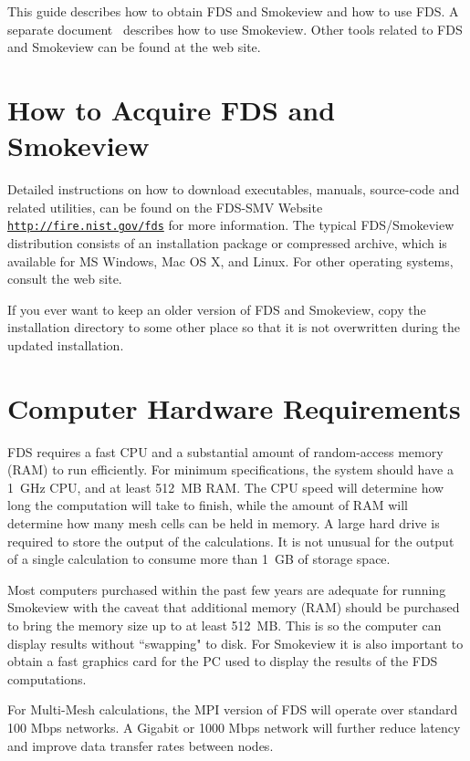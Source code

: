 \documentclass[11pt]{book}
\newcommand{\ct}{\tt\small}
\begin{document}
This guide describes how to obtain FDS and Smokeview and how to use FDS.
A separate document~\cite{Smokeview_Users_Guide_5} describes how to use Smokeview. Other tools related to
FDS and Smokeview can be found at the web site.

\section{How to Acquire FDS and Smokeview}
\label{info:sfcvs}
Detailed instructions on how to download executables, manuals, source-code and related utilities,
can be found on the FDS-SMV Website
\href{http://fire.nist.gov/fds}{{\ct http://fire.nist.gov/fds}} for more information.
The typical FDS/Smokeview distribution consists of an installation package or compressed archive, which is available for MS Windows, Mac OS X, and Linux.  For other operating systems, consult the web site.

\begin{warning}
\noindent
If you ever want to keep an older version of FDS and Smokeview, copy the installation directory to some other
place so that it is not overwritten during the updated installation.
\end{warning}

\section{Computer Hardware Requirements}
FDS requires a fast CPU and a substantial amount of random-access memory (RAM) to run efficiently.
For minimum specifications, the system should have a 1~GHz CPU, and at least 512~MB RAM.
The CPU speed will determine how long the computation will take to finish, while the amount
of RAM will determine how many mesh cells can be held in memory.
A large hard drive is required to store the output of the calculations. It is not unusual for
the output of a single calculation to consume more than 1~GB of storage space.

Most computers purchased within the past few years are adequate for running Smokeview
with the caveat that additional memory (RAM) should be purchased to bring the
memory size up to at least 512~MB. This is so the computer can display results without
``swapping" to disk. For Smokeview it is also important to obtain a fast graphics card
for the PC used to display the results of the FDS computations.

For Multi-Mesh calculations, the MPI version of FDS will operate over standard 100 Mbps networks.
A Gigabit or 1000 Mbps network will further reduce latency and improve data transfer rates between nodes.
\end{document}
